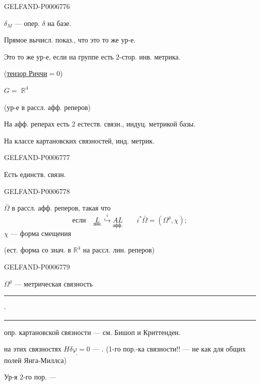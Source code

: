 \begin{GelfandAdjacentEvidence}{GELFAND-P000677}{6}

\(\delta_M\) --- опер. \(\delta\) на базе.

Прямое вычисл. показ., что это то же ур-е.

Это то же ур-е, если на группе есть 2-стор. инв. метрика.

 (\underline{тензор Риччи}\(=0\))

\(G=\)  \(\mathbb R^4\)

(ур-е в рассл. афф. реперов)

На афф. реперах есть 2 естеств. связн., индуц. метрикой базы.

На классе картановских связностей, инд. метрик.

\end{GelfandAdjacentEvidence}
\begin{GelfandAdjacentEvidence}{GELFAND-P000677}{7}

Есть единств. связн.
\end{GelfandAdjacentEvidence}
\begin{GelfandAdjacentEvidence}{GELFAND-P000677}{8}

\(\bar\Omega\) в рассл. афф. реперов, такая что
\[
\text{если}\quad
\underset{\text{лин.}}{L}\overset{i}{\hookrightarrow}
\underset{\text{афф.}}{AL}\qquad
i^*\bar\Omega=(\Omega^g,\chi);
\]
\(\chi\) --- форма смещения

(ест. форма со знач. в \(\mathbb R^4\) на рассл. лин. реперов)
\end{GelfandAdjacentEvidence}
\begin{GelfandAdjacentEvidence}{GELFAND-P000677}{9}


\(\Omega^g\) --- метрическая связность

\noindent\rule{14mm}{.45pt}\enspace\(\cdot\)\enspace\rule{15mm}{.45pt}

опр. картановской связности --- см. Бишоп и Криттенден.

на этих связностях \(\underline{H\delta\varphi=0}\) --- .
(1-го пор.-ка связности!! --- не как для общих полей Янга-Миллса)

Ур-я 2-го пор. ---
\end{GelfandAdjacentEvidence}

